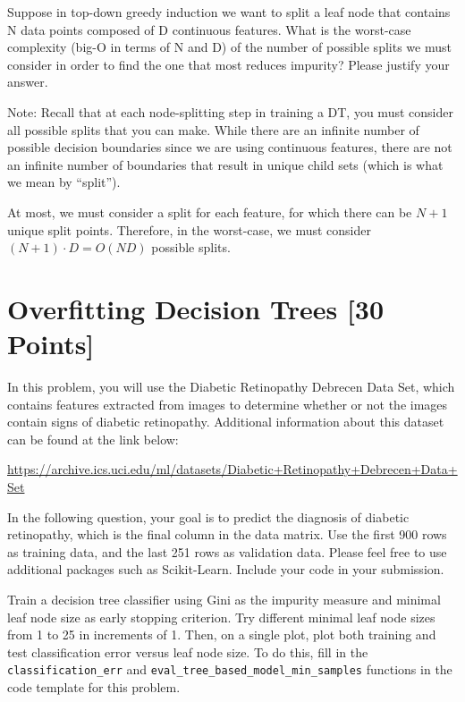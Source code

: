 \problem[4] Suppose in top-down greedy induction we want to split a leaf node that contains N data points composed of
D continuous features. What is the worst-case
complexity (big-O in terms of N and D) of the number of possible splits we must consider in order to find the one that most reduces impurity? Please justify your answer.

Note: Recall that at each node-splitting step in training a DT, you must consider all possible splits that you can make. While there are an infinite number of possible decision boundaries since we are using continuous features, there are not an infinite number of boundaries that result in unique child sets (which is what we mean by ``split'').



\begin{solution}
    At most, we must consider a split for each feature, for which there can be $N+1$ unique split points. Therefore, in the worst-case, we must consider $(N+1) \cdot D = O(ND)$ possible splits.
\end{solution}




\newpage


\section{Overfitting Decision Trees [30 Points]}

In this problem, you will use the Diabetic Retinopathy Debrecen Data Set, which contains features extracted from images to determine whether or not the images contain signs of diabetic retinopathy. Additional information about this dataset can be found at the link below:

\url{https://archive.ics.uci.edu/ml/datasets/Diabetic+Retinopathy+Debrecen+Data+Set}

In the following question, your goal is to predict the diagnosis of diabetic retinopathy, which is the final column in the data matrix.  Use the first 900 rows as training data, and the last
251 rows as validation data. Please feel free to use additional packages such as Scikit-Learn. Include your code in your submission.

\indent\problem[7] %
Train a decision tree classifier using Gini as the impurity measure and minimal leaf node size as early stopping criterion. Try different minimal leaf node sizes from 1 to 25 in increments of 1. Then, on a single plot, plot both training and test classification error versus leaf node size. To do this, fill in the \texttt{classification_err} and \texttt{eval_tree_based_model_min_samples} functions in the code template for this problem.

